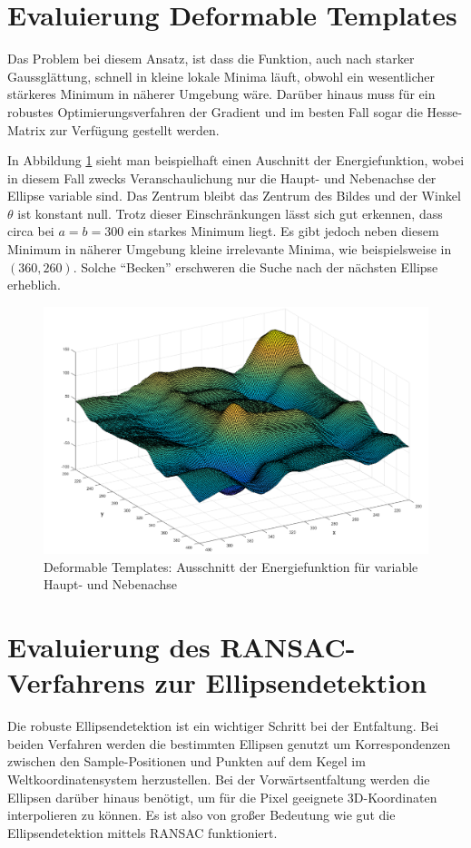 \section{Evaluierung Deformable Templates} 
Das Problem bei diesem Ansatz, ist dass die Funktion, auch nach starker Gaussglättung, schnell in kleine lokale Minima läuft, obwohl ein wesentlicher stärkeres Minimum in näherer Umgebung wäre. Darüber hinaus muss für ein robustes Optimierungsverfahren der Gradient und im besten Fall sogar die Hesse-Matrix zur Verfügung gestellt werden. 

In Abbildung \ref{fig:deformable} sieht man beispielhaft einen Auschnitt der Energiefunktion, wobei in diesem Fall zwecks Veranschaulichung nur die Haupt- und Nebenachse der Ellipse variable sind. Das Zentrum bleibt das Zentrum des Bildes und der Winkel $\theta$ ist konstant null. Trotz dieser Einschränkungen lässt sich gut erkennen, dass circa bei $a = b = 300$ ein starkes Minimum liegt. Es gibt jedoch neben diesem Minimum in näherer Umgebung kleine irrelevante Minima, wie beispielsweise in $(360, 260)$. Solche "`Becken"' erschweren die Suche nach der nächsten Ellipse erheblich.


\begin{figure}[!htb]
	\centering
	\includegraphics[scale=.4]{images/deformable.png}
	\caption{Deformable Templates: Ausschnitt der Energiefunktion für variable Haupt- und Nebenachse}
	\label{fig:deformable}
\end{figure}


\section{Evaluierung des RANSAC-Verfahrens zur Ellipsendetektion}
Die robuste Ellipsendetektion ist ein wichtiger Schritt bei der Entfaltung. Bei beiden Verfahren werden die bestimmten Ellipsen genutzt um Korrespondenzen zwischen den Sample-Positionen und Punkten auf dem Kegel im Weltkoordinatensystem herzustellen. Bei der Vorwärtsentfaltung werden die Ellipsen darüber hinaus benötigt, um für die Pixel geeignete 3D-Koordinaten interpolieren zu können. Es ist also von großer Bedeutung wie gut die Ellipsendetektion mittels RANSAC funktioniert.  


